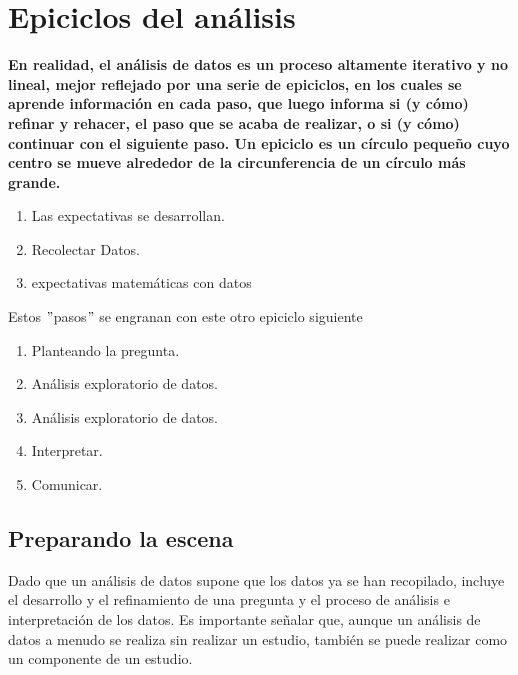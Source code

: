 \documentclass[10pt]{book}
\begin{document}
\chapter{Epiciclos del análisis}
\textbf{En realidad, el análisis de datos es un proceso altamente iterativo y no lineal, mejor reflejado por una serie de epiciclos, en los cuales se aprende información en cada paso, que luego informa si (y cómo) refinar y rehacer, el paso que se acaba de realizar, o si (y cómo) continuar con el siguiente paso. Un epiciclo es un círculo pequeño cuyo centro se mueve alrededor de la circunferencia de un círculo más grande.}\\
\begin{enumerate}[\bfseries 1.]
\item Las expectativas se desarrollan.
\item Recolectar Datos.
\item expectativas matemáticas con datos
\end{enumerate}
Estos $"$pasos$"$ se engranan con este otro epiciclo siguiente
\begin{enumerate}[\bfseries 1.-]
\item Planteando la pregunta.
\item Análisis exploratorio de datos.
\item Análisis exploratorio de datos.
\item Interpretar.
\item Comunicar.
\end{enumerate}
\section{Preparando la escena}
Dado que un análisis de datos supone que los datos ya se han recopilado, incluye el desarrollo y el refinamiento de una pregunta y el proceso de análisis e interpretación de los datos. Es importante señalar que, aunque un análisis de datos a menudo se realiza sin realizar un estudio, también se puede realizar como un componente de un estudio.\\
\end{document}
